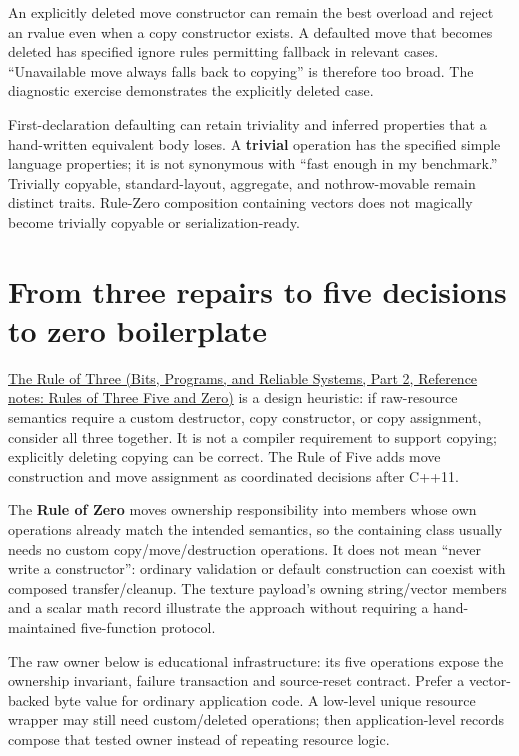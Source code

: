 An explicitly deleted move constructor can remain the best overload and reject an rvalue even when a copy constructor exists. A defaulted move that becomes deleted has specified ignore rules permitting fallback in relevant cases. ``Unavailable move always falls back to copying'' is therefore too broad. The diagnostic exercise demonstrates the explicitly deleted case.

First-declaration defaulting can retain triviality and inferred properties that a hand-written equivalent body loses. A \textbf{trivial} operation has the specified simple language properties; it is not synonymous with ``fast enough in my benchmark.'' Trivially copyable, standard-layout, aggregate, and nothrow-movable remain distinct traits. Rule-Zero composition containing vectors does not magically become trivially copyable or serialization-ready.

\section{From three repairs to five decisions to zero boilerplate}\label{05-engine-i-ch003-from-three-repairs-to-five-decisions-to-zero-boilerplate}

\hypertarget{05-engine-i-ch003-from-three-repairs-to-five-decisions-to-zero-boilerplate}{}

\href{../01-Bits-Programs-and-Reliable-Systems-P02/main.pdf\#appendix-7679107d057e}{The Rule of Three (Bits, Programs, and Reliable Systems, Part 2, Reference notes: Rules of Three Five and Zero)} is a design heuristic: if raw-resource semantics require a custom destructor, copy constructor, or copy assignment, consider all three together. It is not a compiler requirement to support copying; explicitly deleting copying can be correct. The Rule of Five adds move construction and move assignment as coordinated decisions after C++11.

The \textbf{Rule of Zero} moves ownership responsibility into members whose own operations already match the intended semantics, so the containing class usually needs no custom copy/move/destruction operations. It does not mean ``never write a constructor'': ordinary validation or default construction can coexist with composed transfer/cleanup. The texture payload's owning string/vector members and a scalar math record illustrate the approach without requiring a hand-maintained five-function protocol.

The raw owner below is educational infrastructure: its five operations expose the ownership invariant, failure transaction and source-reset contract. Prefer a vector-backed byte value for ordinary application code. A low-level unique resource wrapper may still need custom/deleted operations; then application-level records compose that tested owner instead of repeating resource logic.

